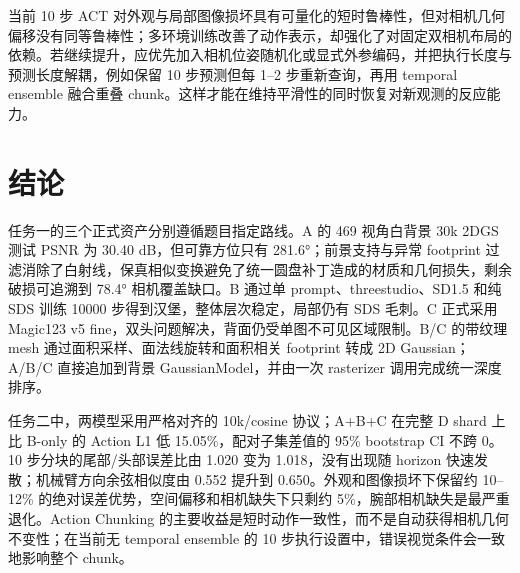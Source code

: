 \documentclass[letterpaper,times,10pt,twocolumn]{article}
\begin{document}
当前 10 步 ACT 对外观与局部图像损坏具有可量化的短时鲁棒性，但对相机几何偏移没有同等鲁棒性；多环境训练改善了动作表示，却强化了对固定双相机布局的依赖。若继续提升，应优先加入相机位姿随机化或显式外参编码，并把执行长度与预测长度解耦，例如保留 10 步预测但每 1--2 步重新查询，再用 temporal ensemble 融合重叠 chunk。这样才能在维持平滑性的同时恢复对新观测的反应能力。

\section{结论}

任务一的三个正式资产分别遵循题目指定路线。A 的 469 视角白背景 30k 2DGS 测试 PSNR 为 30.40 dB，但可靠方位只有 281.6°；前景支持与异常 footprint 过滤消除了白射线，保真相似变换避免了统一圆盘补丁造成的材质和几何损失，剩余破损可追溯到 78.4° 相机覆盖缺口。B 通过单 prompt、threestudio、SD1.5 和纯 SDS 训练 10000 步得到汉堡，整体层次稳定，局部仍有 SDS 毛刺。C 正式采用 Magic123 v5 fine，双头问题解决，背面仍受单图不可见区域限制。B/C 的带纹理 mesh 通过面积采样、面法线旋转和面积相关 footprint 转成 2D Gaussian；A/B/C 直接追加到背景 GaussianModel，并由一次 rasterizer 调用完成统一深度排序。

任务二中，两模型采用严格对齐的 10k/cosine 协议；A+B+C 在完整 D shard 上比 B-only 的 Action L1 低 15.05\%，配对子集差值的 95\% bootstrap CI 不跨 0。10 步分块的尾部/头部误差比由 1.020 变为 1.018，没有出现随 horizon 快速发散；机械臂方向余弦相似度由 0.552 提升到 0.650。外观和图像损坏下保留约 10--12\% 的绝对误差优势，空间偏移和相机缺失下只剩约 5\%，腕部相机缺失是最严重退化。Action Chunking 的主要收益是短时动作一致性，而不是自动获得相机几何不变性；在当前无 temporal ensemble 的 10 步执行设置中，错误视觉条件会一致地影响整个 chunk。
\end{document}
